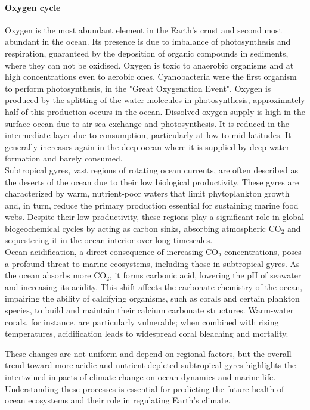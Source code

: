 \paragraph{Oxygen cycle}
Oxygen is the most abundant
element in the Earth’s crust and
second most abundant in the
ocean. Its presence is due to imbalance of
photosynthesis and respiration,
guaranteed by the deposition of
organic compounds in sediments,
where they can not be oxidised. Oxygen is toxic to anaerobic
organisms and at high concentrations even to aerobic ones. Cyanobacteria were the first organism to perform photosynthesis, in the "Great Oxygenation Event". Oxygen is produced by the splitting of the water molecules in photosynthesis, approximately half of this production occurs in the ocean. Dissolved oxygen supply is high
in the surface ocean due to air-sea exchange and
photosynthesis. It is reduced in the intermediate layer due to consumption, particularly at low to mid latitudes. It generally increases again in the deep ocean where it is supplied by deep water
formation and barely consumed.\\
[0.2cm]


Subtropical gyres, vast regions of rotating ocean currents, are often described as the deserts of the ocean due to their low biological productivity. These gyres are characterized by warm, nutrient-poor waters that limit phytoplankton growth and, in turn, reduce the primary production essential for sustaining marine food webs. Despite their low productivity, these regions play a significant role in global biogeochemical cycles by acting as carbon sinks, absorbing atmospheric CO$_2$ and sequestering it in the ocean interior over long timescales.\\

Ocean acidification, a direct consequence of increasing CO$_2$ concentrations, poses a profound threat to marine ecosystems, including those in subtropical gyres. As the ocean absorbs more CO$_2$, it forms carbonic acid, lowering the pH of seawater and increasing its acidity. This shift affects the carbonate chemistry of the ocean, impairing the ability of calcifying organisms, such as corals and certain plankton species, to build and maintain their calcium carbonate structures. Warm-water corals, for instance, are particularly vulnerable; when combined with rising temperatures, acidification leads to widespread coral bleaching and mortality.




These changes are not uniform and depend on regional factors, but the overall trend toward more acidic and nutrient-depleted subtropical gyres highlights the intertwined impacts of climate change on ocean dynamics and marine life. Understanding these processes is essential for predicting the future health of ocean ecosystems and their role in regulating Earth’s climate.\\
[0.2cm]

